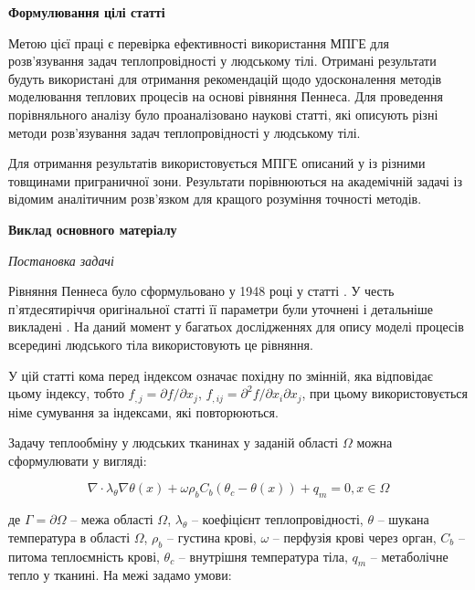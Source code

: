 \begin{center}
  \textbf{Формулювання цілі статті}
\end{center}

Метою цієї праці є перевірка ефективності використання МПГЕ для розв'язування задач теплопровідності у людському тілі.
Отримані результати будуть використані для отримання рекомендацій щодо удосконалення методів моделювання теплових 
процесів на основі рівняння Пеннеса. Для проведення порівняльного аналізу було проаналізовано наукові статті, які 
описують різні методи розв'язування задач теплопровідності у людському тілі.

Для отримання результатів використовується МПГЕ описаний у \cite{grytsko-cobem} із різними товщинами приграничної зони.
Результати порівнюються на академічній задачі із відомим аналітичним розв'язком для кращого розуміння точності методів.
  
\begin{center}
  \textbf{Виклад основного матеріалу}
\end{center}

\begin{center}
  \textit{Постановка задачі}
\end{center}

Рівняння Пеннеса було сформульовано у 1948 році у статті \cite{thermal-process-tissue-pennes}. У честь п'ятдесятиріччя
оригінальної статті її параметри були уточнені і детальніше викладені \cite{thermal-process-tissue-pennes-explained}. На
даний момент у багатьох дослідженнях для опису моделі процесів всередині людського тіла використовують це рівняння.

У цій статті кома перед індексом означає похідну по змінній, яка відповідає цьому індексу, тобто ${f_{,j} =
\partial}{f/\partial}x_{j}$, ${{f_{,ij} = \partial^{2}}{f/\partial}x_{i}\partial x_{j}}{}$, при цьому використовується
німе сумування за індексами, які повторюються.

Задачу теплообміну у людських тканинах у заданій області $\Omega$ можна сформулювати у вигляді:

\begin{equation}
  \label{eqn:theory_thermo_pennes_eqn}
  \nabla \cdot \lambda_\theta \nabla \theta(x) + \omega \rho_b C_b (\theta_c - \theta(x)) + q_m  = 0, x \in \Omega
\end{equation}

\noindent де $\Gamma = \partial \Omega$ -- межа області $\Omega$, $\lambda_\theta$ -- коефіцієнт теплопровідності,
$\theta$ -- шукана температура в області $\Omega$,
$\rho_b$ -- густина крові, $\omega$ -- перфузія крові через орган, $C_b$ -- питома теплоємність крові,
$\theta_c$ -- внутрішня температура тіла, $q_m$ -- метаболічне тепло у тканині. На межі задамо умови:

